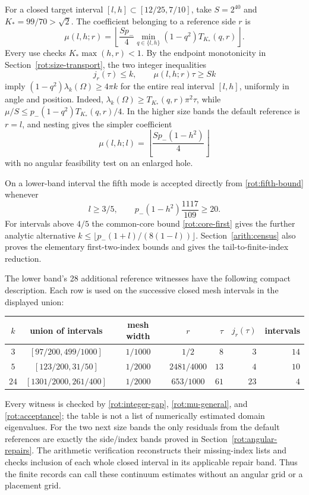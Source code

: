 \documentclass[11pt,reqno]{amsart}
\numberwithin{equation}{section}
\begin{document}
For a closed target interval $[l,h]\subset[12/25,7/10]$, take
$S=2^{40}$ and $K_*=99/70>\sqrt2$. The coefficient belonging to a
reference side $r$ is
\begin{equation}\label{rot:mu-general}
 \mu(l,h;r)=\left\lfloor\frac{Sp_-}{4}
     \min_{q\in\{l,h\}}(1-q^2)T_{K_*}(q,r)\right\rfloor.
\end{equation}
Every use checks $K_*\max(h,r)<1$. By the endpoint monotonicity in
Section~\ref{rot:size-transport}, the two integer inequalities
\begin{equation}\label{rot:acceptance}
 j_r(\tau)\leq k,\qquad \mu(l,h;r)\tau\geq Sk
\end{equation}
imply $(1-q^2)\lambda_k(\Omega)\geq4\pi k$ for the entire real
interval $[l,h]$, uniformly in angle and position. Indeed,
$\lambda_k(\Omega)\geq T_{K_*}(q,r)\pi^2\tau$, while
$\mu/S\leq p_-(1-q^2)T_{K_*}(q,r)/4$. In the higher size bands
the default reference is $r=l$, and nesting gives the simpler
coefficient
\begin{equation}\label{rot:mu-nesting}
 \mu(l,h;l)=\left\lfloor\frac{Sp_-(1-h^2)}4\right\rfloor
\end{equation}
with no angular feasibility test on an enlarged hole.

On a lower-band interval the fifth mode is accepted directly from
\eqref{rot:fifth-bound} whenever
\begin{equation}\label{rot:gram-flag}
 l\geq3/5,\qquad p_-(1-h^2)\frac{1117}{109}\geq20.
\end{equation}
For intervals above $4/5$ the common-core bound
\eqref{rot:core-first} gives the further analytic alternative
$k\leq\lfloor p_-(1+l)/(8(1-l))\rfloor$. Section~\ref{arith:census}
also proves the elementary first-two-index bounds and gives the
tail-to-finite-index reduction.

The lower band's 28 additional reference witnesses have the following
compact description. Each row is used on the successive closed mesh
intervals in the displayed union:
\begin{center}
\begin{tabular}{c|c|c|c|r|r|r}
 $k$&union of intervals&mesh width&$r$&$\tau$&$j_r(\tau)$&intervals\\ \hline
 $3$&$[97/200,499/1000]$&$1/1000$&$1/2$&$8$&$3$&$14$\\
 $5$&$[123/200,31/50]$&$1/2000$&$2481/4000$&$13$&$4$&$10$\\
 $24$&$[1301/2000,261/400]$&$1/2000$&$653/1000$&$61$&$23$&$4$
\end{tabular}
\end{center}
Every witness is checked by \eqref{rot:integer-gap},
\eqref{rot:mu-general}, and \eqref{rot:acceptance}; the table is not a
list of numerically estimated domain eigenvalues. For the two next
size bands the only residuals from the default references are exactly
the side/index bands proved in Section~\ref{rot:angular-repairs}.
The arithmetic verification reconstructs their missing-index lists and
checks inclusion of each whole closed interval in its applicable repair
band. Thus the finite records can call these continuum estimates
without an angular grid or a placement grid.
\end{document}
